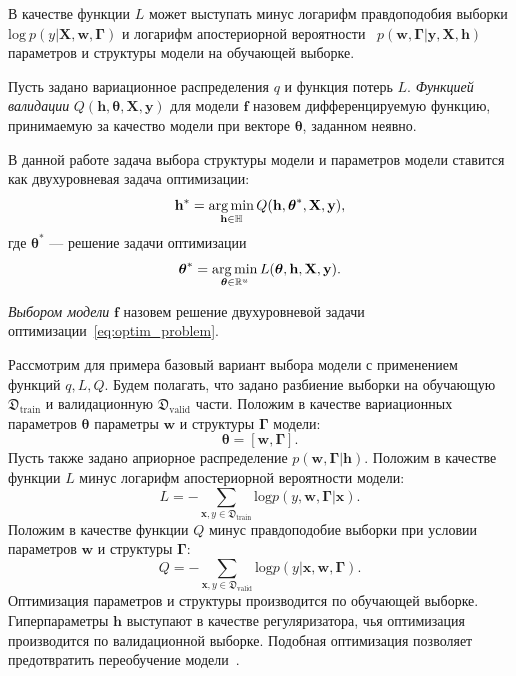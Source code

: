 В качестве функции $L$ может выступать минус логарифм правдоподобия выборки $\text{log}~p(y|\mathbf{X}, \mathbf{w}, \boldsymbol{\Gamma})$  и логарифм апостериорной вероятности ~$p(\mathbf{w}, \boldsymbol{\Gamma}|\mathbf{y}, \mathbf{X}, \mathbf{h}) $ параметров и структуры модели на обучающей выборке.

\begin{defin}
Пусть задано вариационное распределения $q$ и функция потерь $L$. 
\textit{Функцией валидации} $Q(\mathbf{h}, \boldsymbol{\theta}, \mathbf{X}, \mathbf{y} )$ для модели $\mathbf{f}$ назовем дифференцируемую функцию, принимаемую за качество модели при векторе $\boldsymbol{\theta}$, заданном неявно.
\end{defin}
 

В данной работе задача выбора структуры модели и параметров модели ставится как двухуровневая задача оптимизации:
\begin{equation}
\label{eq:optim_problem}
	\mathbf{h}^{*} = \operatorname*{arg\,min}_{\mathbf{h} \in \mathbb{H}} Q(\mathbf{h},  \boldsymbol{\theta}^{*}, \mathbf{X}, \mathbf{y} ),
\end{equation}
где $\boldsymbol{\theta}^{*}$ --- решение задачи оптимизации
\begin{equation}
\label{eq:optim_problem_in}
   \boldsymbol{\theta}^{*} = \operatorname*{arg\,min}_{\boldsymbol{\theta} \in \mathbb{R}^u} L(\boldsymbol{\theta},  \mathbf{h},  \mathbf{X}, \mathbf{y}).
\end{equation}

\begin{defin}
\textit{Выбором модели} $\mathbf{f}$ назовем решение двухуровневой задачи оптимизации~\eqref{eq:optim_problem}.
\end{defin}

Рассмотрим для примера базовый вариант выбора модели с применением функций $q, L, Q$.
Будем полагать, что задано разбиение выборки на обучающую $\mathfrak{D}_\text{train}$ и валидационную $\mathfrak{D}_\text{valid}$ части.
Положим в качестве вариационных параметров $\boldsymbol{\theta}$ параметры $\mathbf{w}$ и структуры $\boldsymbol{\Gamma}$ модели:
\[
    \boldsymbol{\theta} = [\mathbf{w}, \boldsymbol{\Gamma}].
\]
Пусть также задано априорное распределение $p(\mathbf{w}, \boldsymbol{\Gamma}|\mathbf{h})$.
Положим в качестве функции $L$ минус логарифм апостериорной вероятности модели:
\[
    L = -\sum_{\mathbf{x},y \in \mathfrak{D}_\text{train}} \text{log}p(y, \mathbf{w}, \boldsymbol{\Gamma}|\mathbf{x}).
\]
Положим в качестве функции $Q$  минус правдоподобие выборки при условии параметров $\mathbf{w}$ и структуры $\boldsymbol{\Gamma}$:
\[
    Q = -\sum_{\mathbf{x},y \in \mathfrak{D}_\text{valid}} \text{log}p(y|\mathbf{x}, \mathbf{w}, \boldsymbol{\Gamma}).
\]
Оптимизация параметров и структуры производится по обучающей выборке. Гиперпараметры $\mathbf{h}$ выступают в качестве регуляризатора, чья оптимизация производится по валидационной выборке. Подобная оптимизация позволяет предотвратить переобучение модели~\cite{hyper}.


